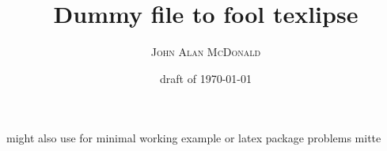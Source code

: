 \documentclass[11pt]{article}
\title{Dummy file to fool texlipse}
\author{\textsc{John Alan McDonald}}
\date{draft of \today}
\begin{document}
\maketitle

might also use for minimal working example or latex package problems
 mitte
 
\end{document}
